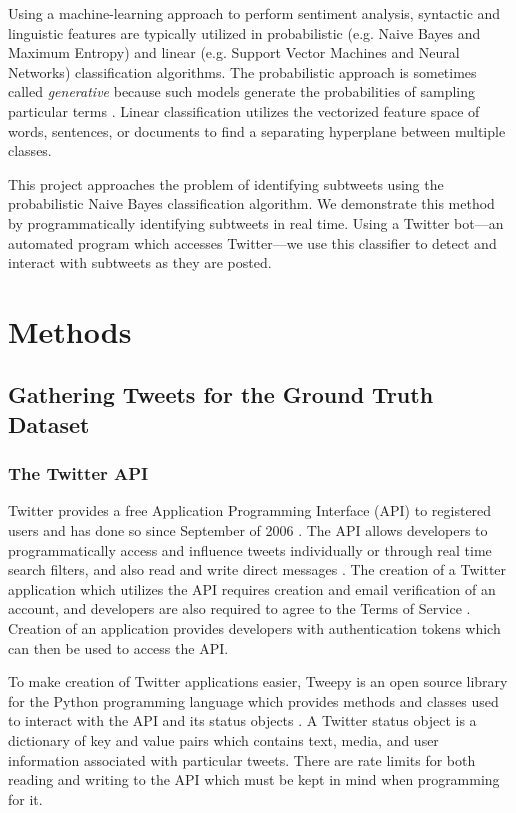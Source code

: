\documentclass[11pt, twoside, reqno]{book}
\begin{document}
Using a machine-learning approach to perform sentiment analysis, syntactic and linguistic features are typically utilized in probabilistic (e.g. Naive Bayes and Maximum Entropy) and linear (e.g. Support Vector Machines and Neural Networks) classification algorithms. The probabilistic approach is sometimes called \textit{generative} because such models generate the probabilities of sampling particular terms \cite{sentiment_survey}. Linear classification utilizes the vectorized feature space of words, sentences, or documents to find a separating hyperplane between multiple classes. 

This project approaches the problem of identifying subtweets using the probabilistic Naive Bayes classification algorithm. We demonstrate this method by programmatically identifying subtweets in real time. Using a Twitter bot---an automated program which accesses Twitter---we use this classifier to detect and interact with subtweets as they are posted.

\chapter{Methods}
\label{methods}

\section{Gathering Tweets for the Ground Truth Dataset}
\label{gathering_tweets}

\subsection{The Twitter API}
\label{twitter_api}

Twitter provides a free Application Programming Interface (API) to registered users and has done so since September of 2006 \cite{twitter_api_start}. The API allows developers to programmatically access and influence tweets individually or through real time search filters, and also read and write direct messages \cite{twitter_api_docs}. The creation of a Twitter application which utilizes the API requires creation and email verification of an account, and developers are also required to agree to the Terms of Service \cite{twitter_tos}. Creation of an application provides developers with authentication tokens which can then be used to access the API.

To make creation of Twitter applications easier, Tweepy \cite{tweepy_python} is an open source library for the Python programming language which provides methods and classes used to interact with the API and its status objects \cite{tweepy_status_object}. A Twitter status object is a dictionary of key and value pairs which contains text, media, and user information associated with particular tweets. There are rate limits for both reading and writing to the API which must be kept in mind when programming for it.
\end{document}
